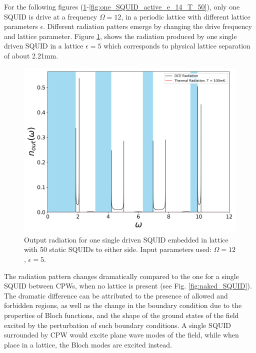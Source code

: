 For the following figures (\ref{fig:one_SQUID_active}-\ref{fig:one_SQUID_active_e_14_T_50}), only one SQUID is drive at a frequency $\Omega =12$, in a periodic lattice with different lattice parameters $\epsilon$. Different radiation patters emerge by changing the drive frequency and lattice parameter. Figure \ref{fig:one_SQUID_active}, shows the radiation produced by one single driven SQUID in a lattice $\epsilon=5$ which corresponds to physical lattice separation of about 2.21mm.
%
\begin{figure}
    \centering
    \includegraphics[width=\textwidth, keepaspectratio]{figures/results/one_SQUID_active.png}
    \caption{Output radiation for one single driven SQUID embedded in lattice with 50 static SQUIDs to either side. Input parameters used: $\Omega=12$, $\epsilon=5$.}
    \label{fig:one_SQUID_active}
\end{figure}
%
\newpage
The radiation pattern changes dramatically compared to the one for a single SQUID between CPWs, when no lattice is present (see Fig. \ref{fig:naked_SQUID}). The dramatic difference can be attributed to the presence of allowed and forbidden regions, as well as the change in the boundary condition due to the properties of Bloch functions, and the shape of the ground states of the field excited by the perturbation of such boundary conditions. A single SQUID surrounded by CPW would excite plane wave modes of the field, while when place in a lattice, the Bloch modes are excited instead.
%
